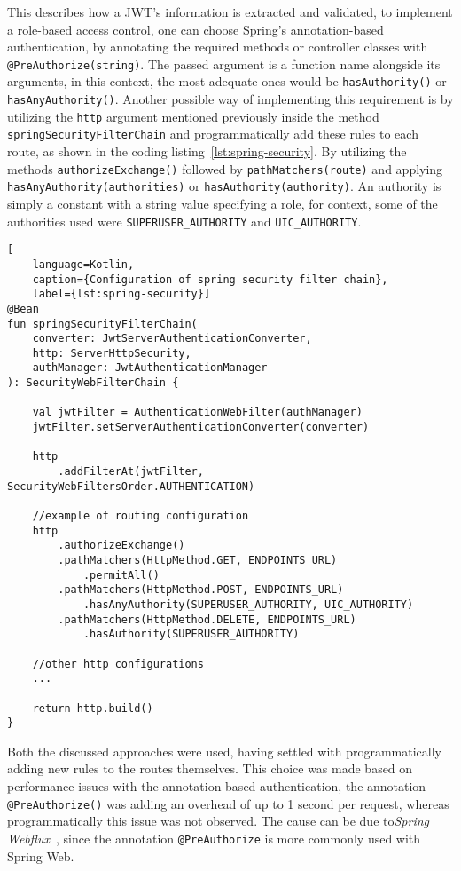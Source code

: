 This describes how a JWT's information is extracted and validated, to implement a role-based access control, one can choose Spring's annotation-based authentication, by annotating the required methods or controller classes with \texttt{@PreAuthorize(string)}. The passed argument is a function name alongside its arguments, in this context, the most adequate ones would be \texttt{hasAuthority()} or \texttt{hasAnyAuthority()}. Another possible way of implementing this requirement is by utilizing the \texttt{http} argument mentioned previously inside the method \texttt{springSecurityFilterChain} and programmatically add these rules to each route, as shown in the coding listing~\ref{lst:spring-security}. By utilizing the methods \texttt{authorizeExchange()} followed by \texttt{pathMatchers(route)} and applying \texttt{hasAnyAuthority(authorities)} or \texttt{hasAuthority(authority)}. An authority is simply a constant with a string value specifying a role, for context, some of the authorities used were \texttt{SUPERUSER\_AUTHORITY} and \texttt{UIC\_AUTHORITY}. 


\begin{lstlisting}[
    language=Kotlin, 
    caption={Configuration of spring security filter chain},
    label={lst:spring-security}]
@Bean
fun springSecurityFilterChain(
    converter: JwtServerAuthenticationConverter,
    http: ServerHttpSecurity,
    authManager: JwtAuthenticationManager
): SecurityWebFilterChain {

    val jwtFilter = AuthenticationWebFilter(authManager)
    jwtFilter.setServerAuthenticationConverter(converter)

    http
        .addFilterAt(jwtFilter, SecurityWebFiltersOrder.AUTHENTICATION)

    //example of routing configuration
    http
        .authorizeExchange()
        .pathMatchers(HttpMethod.GET, ENDPOINTS_URL)
            .permitAll()
        .pathMatchers(HttpMethod.POST, ENDPOINTS_URL)
            .hasAnyAuthority(SUPERUSER_AUTHORITY, UIC_AUTHORITY)
        .pathMatchers(HttpMethod.DELETE, ENDPOINTS_URL)
            .hasAuthority(SUPERUSER_AUTHORITY)
             
    //other http configurations
    ...
            
    return http.build()
}
\end{lstlisting}

Both the discussed approaches were used, having settled with programmatically adding new rules to the routes themselves. This choice was made based on performance issues with the annotation-based authentication, the annotation \texttt{@PreAuthorize()} was adding an overhead of up to 1 second per request, whereas programmatically this issue was not observed. The cause can be due to\textit{Spring Webflux}~\cite{spring-webflux}, since the annotation \texttt{@PreAuthorize} is more commonly used with Spring Web.


